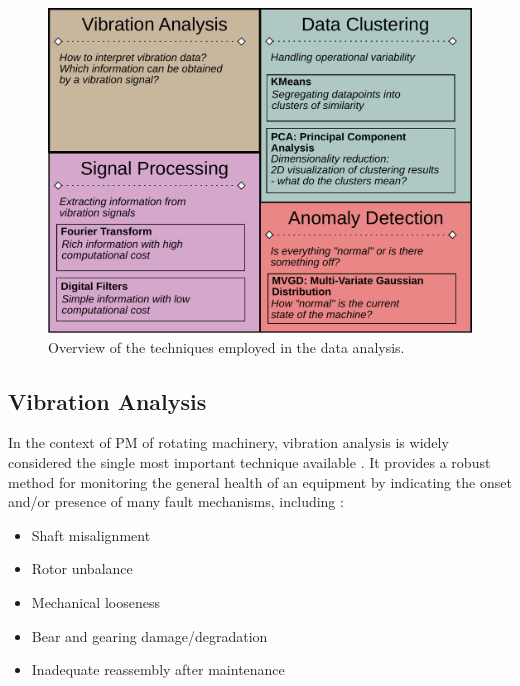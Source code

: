 \documentclass[conference]{IEEEtran}
\begin{document}
\begin{figure}[htbp]
\centerline{\includegraphics[width=\columnwidth]{graphics/techniques/techniques_block.pdf}}
\caption{Overview of the techniques employed in the data analysis.}
\label{techniques_overview}
\end{figure}



\subsection{Vibration Analysis}
\label{sec_vibration_analysis}



In the context of PM of rotating machinery, vibration analysis is widely considered the single most important technique available \cite{b1}. It provides a robust method for monitoring the general health of an equipment by indicating the onset and/or presence of many fault mechanisms, including \cite{b1}:

\begin{itemize}
    \item Shaft misalignment
    \item Rotor unbalance
    \item Mechanical looseness
    \item Bear and gearing damage/degradation
    \item Inadequate reassembly after maintenance
\end{itemize}
\end{document}
